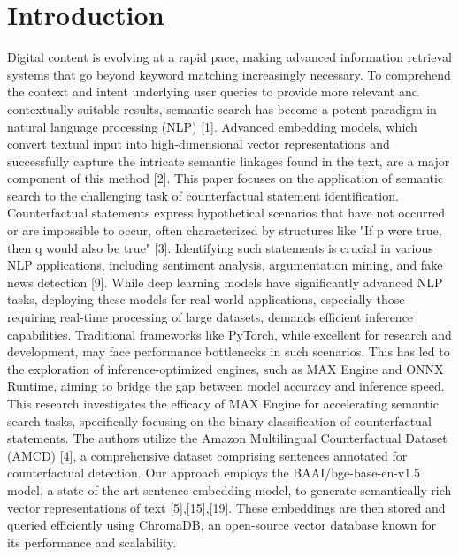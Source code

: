 \documentclass[conference]{IEEEtran}
\begin{document}
\section{Introduction}
Digital content is evolving at a rapid pace, making advanced information retrieval systems that go beyond keyword matching increasingly necessary. To comprehend the context and intent underlying user queries to provide more relevant and contextually suitable results, semantic search has become a potent paradigm in natural language processing (NLP) [1]. Advanced embedding models, which convert textual input into high-dimensional vector representations and successfully capture the intricate semantic linkages found in the text, are a major component of this method [2].
This paper focuses on the application of semantic search to the challenging task of counterfactual statement identification. Counterfactual statements express hypothetical scenarios that have not occurred or are impossible to occur, often characterized by structures like "If p were true, then q would also be true" [3]. Identifying such statements is crucial in various NLP applications, including sentiment analysis, argumentation mining, and fake news detection [9].
While deep learning models have significantly advanced NLP tasks, deploying these models for real-world applications, especially those requiring real-time processing of large datasets, demands efficient inference capabilities. Traditional frameworks like PyTorch, while excellent for research and development, may face performance bottlenecks in such scenarios. This has led to the exploration of inference-optimized engines, such as MAX Engine and ONNX Runtime, aiming to bridge the gap between model accuracy and inference speed.
This research investigates the efficacy of MAX Engine for accelerating semantic search tasks, specifically focusing on the binary classification of counterfactual statements. The authors utilize the Amazon Multilingual Counterfactual Dataset (AMCD) [4], a comprehensive dataset comprising sentences annotated for counterfactual detection. Our approach employs the BAAI/bge-base-en-v1.5 model, a state-of-the-art sentence embedding model, to generate semantically rich vector representations of text [5],[15],[19]. These embeddings are then stored and queried efficiently using ChromaDB, an open-source vector database known for its performance and scalability.
\end{document}
